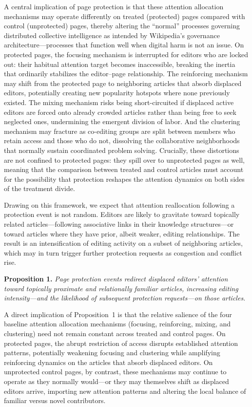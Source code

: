 \documentclass[11pt]{article}
\begin{document}
A central implication of page protection is that these attention allocation mechanisms may operate differently on treated (protected) pages compared with control (unprotected) pages, thereby altering the ``normal'' processes governing distributed collective intelligence as intended by Wikipedia's governance architecture---processes that function well when digital harm is not an issue. On protected pages, the focusing mechanism is interrupted for editors who are locked out: their habitual attention target becomes inaccessible, breaking the inertia that ordinarily stabilizes the editor--page relationship. The reinforcing mechanism may shift from the protected page to neighboring articles that absorb displaced editors, potentially creating new popularity hotspots where none previously existed. The mixing mechanism risks being short-circuited if displaced active editors are forced onto already crowded articles rather than being free to seek neglected ones, undermining the emergent division of labor. And the clustering mechanism may fracture as co-editing groups are split between members who retain access and those who do not, dissolving the collaborative neighborhoods that normally sustain coordinated problem solving. Crucially, these distortions are not confined to protected pages: they spill over to unprotected pages as well, meaning that the comparison between treated and control articles must account for the possibility that protection reshapes the attention dynamics on both sides of the treatment divide.

Drawing on this framework, we expect that attention reallocation following a protection event is not random. Editors are likely to gravitate toward topically related articles---following associative links in their knowledge structures---or toward articles where they have prior, albeit weaker, editing relationships. The result is an intensification of editing activity on a subset of neighboring articles, which may in turn trigger further protection requests as congestion and conflict rise.

\smallskip
\noindent\textbf{Proposition 1.} \emph{Page protection events redirect displaced editors' attention toward topically proximate and relationally familiar articles, increasing editing intensity---and the likelihood of subsequent protection requests---on those articles.}

\smallskip
A direct implication of Proposition~1 is that the relative salience of the four baseline attention allocation mechanisms (focusing, reinforcing, mixing, and clustering) need not remain constant across treated and control pages. On protected pages, the abrupt restriction of access disrupts established attention patterns, potentially weakening focusing and clustering while amplifying reinforcing dynamics on the articles that absorb displaced editors. On unprotected control pages, by contrast, these mechanisms may continue to operate as they normally would---or they may themselves shift as displaced editors arrive, importing new attention patterns and altering the local balance of familiar versus novel contributors.
\end{document}

